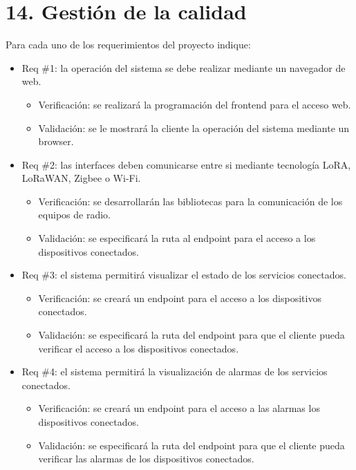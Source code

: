 \documentclass[
11pt%
]{charter}
\begin{document}
\section{14. Gestión de la calidad}
\label{sec:calidad}


Para cada uno de los requerimientos del proyecto indique:
\begin{itemize} 
\item Req \#1: la operación del sistema se debe realizar mediante un navegador de web.

\begin{itemize}
	\item Verificación: se realizará la programación del frontend para el acceso web.  
	\item Validación: se le mostrará la cliente la operación del sistema mediante un browser.
\end{itemize}

\item Req \#2: las interfaces deben comunicarse entre si mediante tecnología LoRA, LoRaWAN, Zigbee o Wi-Fi.

\begin{itemize}
	\item Verificación: se desarrollarán las bibliotecas para la comunicación de los equipos de radio.  
	\item Validación: se especificará la ruta al endpoint para el acceso a los dispositivos conectados.
\end{itemize}

\item Req \#3: el sistema permitirá visualizar el estado de los servicios conectados.

\begin{itemize}
	\item Verificación: se creará un endpoint para el acceso a los dispositivos conectados.  
	\item Validación: se especificará la ruta del endpoint para que el cliente pueda verificar el acceso a los dispositivos conectados.
\end{itemize}

\item Req \#4: el sistema permitirá la visualización de alarmas de los servicios conectados.

\begin{itemize}
	\item Verificación: se creará un endpoint para el acceso a las alarmas los dispositivos conectados.  
	\item Validación: se especificará la ruta del endpoint para que el cliente pueda verificar las alarmas de los dispositivos conectados.
\end{itemize}


\end{itemize}
\end{document}
